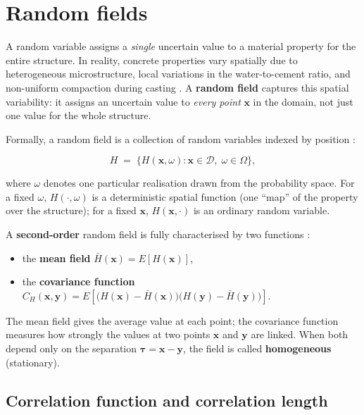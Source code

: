 \section{Random fields} \label{sec:random-fields}

A random variable assigns a \emph{single} uncertain value to a material property for the entire structure. In reality, concrete properties vary spatially due to heterogeneous microstructure, local variations in the water-to-cement ratio, and non-uniform compaction during casting \cite{delarrard2010}. A \textbf{random field} captures this spatial variability: it assigns an uncertain value to \emph{every point} $\mathbf{x}$ in the domain, not just one value for the whole structure.

Formally, a random field is a collection of random variables indexed by position \cite{sudret2000}:

\begin{equation}
    H \;=\; \bigl\{H(\mathbf{x},\omega) :
    \mathbf{x} \in \mathcal{D},\;
    \omega \in \Omega \bigr\},
    \label{eq:rf-definition}
\end{equation}

where $\omega$ denotes one particular realisation drawn from the probability space. For a fixed $\omega$, $H(\cdot,\omega)$ is a deterministic spatial function (one ``map'' of the property over the structure); for a fixed $\mathbf{x}$, $H(\mathbf{x},\cdot)$ is an ordinary random variable.

A \textbf{second-order} random field is fully characterised by two functions \cite{sudret2000}:

\begin{itemize}
    \item the \textbf{mean field}
    $\bar{H}(\mathbf{x}) = E\!\left[H(\mathbf{x})\right]$,
    \item the \textbf{covariance function}
    $C_H(\mathbf{x},\mathbf{y}) = E\!\left[
        \bigl(H(\mathbf{x}) - \bar{H}(\mathbf{x})\bigr)
        \bigl(H(\mathbf{y}) - \bar{H}(\mathbf{y})\bigr)
    \right]$.
\end{itemize}

The mean field gives the average value at each point; the covariance function measures how strongly the values at two points $\mathbf{x}$ and $\mathbf{y}$ are linked. When both depend only on the separation $\boldsymbol{\tau} = \mathbf{x} - \mathbf{y}$, the field is called \textbf{homogeneous} (stationary).

\subsection{Correlation function and correlation length} \label{sec:correlation}

